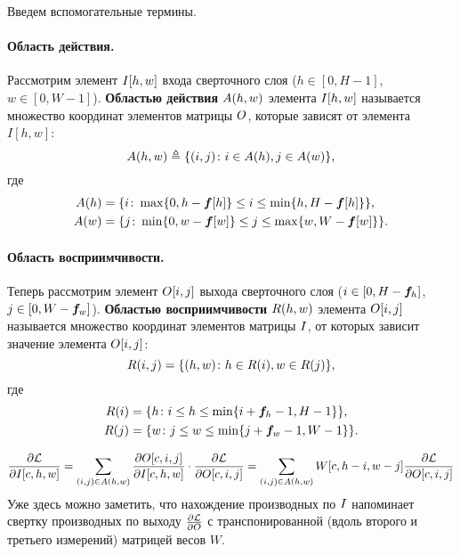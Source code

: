 \documentclass{report}
\numberwithin{theorem}{chapter}
\numberwithin{statement}{chapter}
\numberwithin{lemma}{chapter}
\theoremstyle{definition}
\numberwithin{task}{chapter}
\theoremstyle{remark}
\numberwithin{example}{chapter}
\theoremstyle{definition}
\numberwithin{definition}{chapter}
\theoremstyle{remark}
\theoremstyle{remark}
\numberwithin{lyrics}{section}
\begin{document}
Введем вспомогательные термины. 

\paragraph{Область действия.}
Рассмотрим элемент $I[h, w]$ входа сверточного слоя ($h \in [0, H - 1]$, $w \in [0, W - 1]$). \textbf{Областью действия} $A(h, w)$ элемента $I[h, w]$ называется множество координат элементов матрицы $O$, которые зависят от элемента $I[h, w]$:
\begin{equation}
A(h, w) \triangleq \{(i, j)\colon i \in A(h), j\in A(w)\},
\end{equation}
где
\begin{align}
A(h)& = \{i \colon \max\{0, h - \boldsymbol{f}[h]\} \le i \le \min\{h, H - \boldsymbol{f}[h]\}\}, \\
A(w)& = \{j \colon \min\{0, w - \boldsymbol{f}[w]\} \le j \le \max\{w, W - \boldsymbol{f}[w]\}\}.
\end{align}

\paragraph{Область восприимчивости.}
Теперь рассмотрим элемент $O[i, j]$ выхода сверточного слоя ($i \in [0, H - \boldsymbol{f}_h]$, $j \in [0, W - \boldsymbol{f}_w]$). \textbf{Областью восприимчивости} $R(h, w)$ элемента $O[i, j]$ называется множество координат элементов матрицы $I$, от которых зависит значение элемента $O[i, j]$:
\begin{equation}
\label{eq:receptive_field}
R(i, j) = \{(h, w) \colon h \in R(i), w \in R(j)\},
\end{equation}
где
\begin{align}
\label{eq:receptive_field:add}
R(i) &= \{h \colon i \le h \le \min\{i + \boldsymbol{f}_h - 1, H - 1\}\}, \\
R(j) &= \{w \colon j \le w \le \min\{j + \boldsymbol{f}_w - 1, W - 1\}\}.
\end{align}


\begin{equation}
\label{eq:conv:backprop:1}
\frac{\partial \mathcal{L} }{\partial I[c, h, w]}= \sum\limits_{(i, j) \in A(h, w)} 
\frac{\partial O[c, i, j] }{\partial I[c, h, w]} \cdot \frac{\partial \mathcal{L} }{\partial O[c, i, j]} = 
\sum\limits_{(i, j) \in A(h, w)} W[c, h - i, w - j] \frac{\partial \mathcal{L} }{\partial O[c, i, j]}
\end{equation}
Уже здесь можно заметить, что нахождение производных по $I$ напоминает свертку производных по выходу $\frac{\partial \mathcal{L} }{\partial O}$
с транспонированной (вдоль второго и третьего измерений) матрицей весов $W$.
\end{document}

